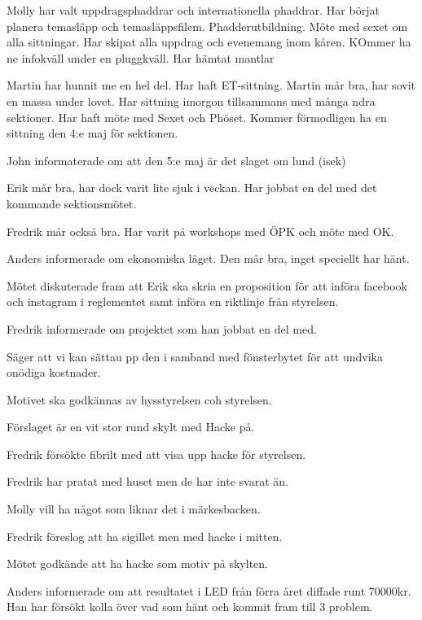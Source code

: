 \documentclass[10pt]{article}
\begin{document}
\begin{paragrafer}
\begin{paragrafer}
Molly har valt uppdragsphaddrar och internationella phaddrar. Har börjat planera temasläpp och temasläppsfilem. Phadderutbildning. Möte med sexet om alla sittningar. Har skipat alla uppdrag och evenemang inom kåren. KOmmer ha ne infokväll under en pluggkväll. Har hämtat mantlar

Martin har hunnit me en hel del. Har haft ET-sittning. Martin mår bra, har sovit en massa under lovet. Har sittning imorgon tillsammans med många ndra sektioner. Har haft möte med Sexet och Phöset. Kommer förmodligen ha en sittning den 4:e maj för sektionen.

John informaterade om att den 5:e maj är det slaget om lund (isek)

Erik mår bra, har dock varit lite sjuk i veckan. Har jobbat en del med det kommande sektionsmötet.

Fredrik mår också bra. Har varit på workshops med ÖPK och möte med OK.


Anders informerade om ekonomiska läget. Den mår bra, inget speciellt har hänt.

\end{paragrafer}

Mötet diskuterade fram att Erik ska skria en proposition för att införa facebook och instagram i reglementet samt införa en riktlinje från styrelsen.

Fredrik informerade om projektet som han jobbat en del med.

Säger att vi kan sättau pp den i samband med fönsterbytet för att undvika onödiga kostnader.

Motivet ska godkännas av hysstyrelsen coh styrelsen.

Förslaget är en vit stor rund skylt med Hacke på.

Fredrik försökte fibrilt med att visa upp hacke för styrelsen.

Fredrik har pratat med huset men de har inte svarat än.

Molly vill ha något som liknar det i märkesbacken.

Fredrik föreslog att ha sigillet men med hacke i mitten.

Mötet godkände att ha hacke som motiv på skylten.

Anders informerade om att resultatet i LED från förra året diffade runt 70000kr. Han har försökt kolla över vad som hänt och kommit fram till 3 problem.


\end{paragrafer}
\end{document}
